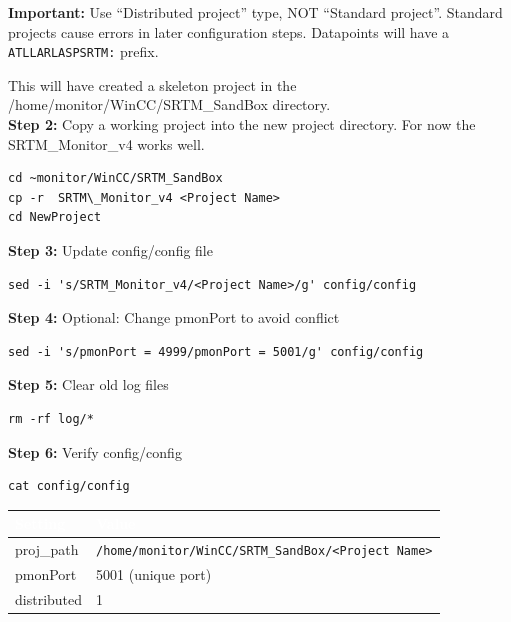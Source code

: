 \documentclass[11pt,a4paper]{article}
\begin{document}
\begin{warningbox}
\textbf{Important:} Use ``Distributed project'' type, NOT ``Standard project''. Standard projects cause errors in later configuration steps. Datapoints will have a \texttt{ATLLARLASPSRTM:} prefix.
\end{warningbox}




\noindent This will have created a skeleton project in the /home/monitor/WinCC/SRTM\_SandBox directory. \\
    
\noindent\textbf{Step 2:} Copy a working project into the new project directory. For now the SRTM\_Monitor\_v4 works well.

\begin{lstlisting}
cd ~monitor/WinCC/SRTM_SandBox
cp -r  SRTM\_Monitor_v4 <Project Name>
cd NewProject
\end{lstlisting}

\noindent\textbf{Step 3:} Update config/config file
\begin{lstlisting}
sed -i 's/SRTM_Monitor_v4/<Project Name>/g' config/config
\end{lstlisting}

\noindent\textbf{Step 4:} Optional: Change pmonPort to avoid conflict
\begin{lstlisting}
sed -i 's/pmonPort = 4999/pmonPort = 5001/g' config/config
\end{lstlisting}

\noindent\textbf{Step 5:} Clear old log files
\begin{lstlisting}
rm -rf log/*
\end{lstlisting}

\noindent\textbf{Step 6:} Verify config/config
\begin{lstlisting}
cat config/config
\end{lstlisting}

\begin{center}
\begin{tabular}{|l|l|}
\hline
\rowcolor{tableheader}\textcolor{white}{\textbf{Setting}} & \textcolor{white}{\textbf{Value}} \\
\hline
proj\_path & \texttt{/home/monitor/WinCC/SRTM\_SandBox/<Project Name>} \\
\hline
pmonPort & 5001 (unique port) \\
\hline
distributed & 1 \\
\hline
\end{tabular}
\end{center}
\end{document}

